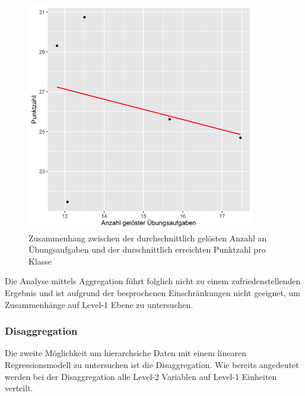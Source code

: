 \documentclass[12pt]{article}\usepackage[]{graphicx}\usepackage[]{color}
\numberwithin{equation}{section}
\begin{document}
\begin{figure}[b!]
\centering
\includegraphics[width = 10cm, height = 10cm]{aggregation}
\caption{Zusammenhang zwischen der durchschnittlich gelösten Anzahl an Übungsaufgaben und der durschnittlich erreichten Punktzahl pro Klasse}
\label{fig:aggregiert}
\end{figure}

Die Analyse mittels Aggregation führt folglich nicht zu einem zufriedenstellenden Ergebnis und ist aufgrund der besprochenen Einschränkungen nicht geeignet, um Zusammenhänge auf Level-1 Ebene zu untersuchen.

\subsubsection{Disaggregation}
Die zweite Möglichkeit um hierarchsiche Daten mit einem linearen Regressionsmodell zu untersuchen ist die Disaggregation. Wie bereits angedeutet werden bei der Disaggregation alle Level-2 Variablen auf Level-1 Einheiten verteilt. 
\end{document}
